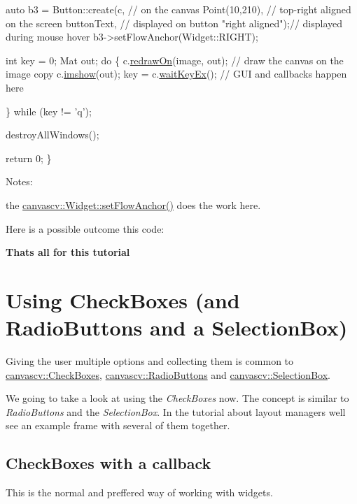 \begin{DoxyCode}
    \textcolor{keyword}{auto} b3 = Button::create(c,               \textcolor{comment}{// on the canvas}
                             Point(10,210),    \textcolor{comment}{// top-right aligned on the screen}
                             buttonText,      \textcolor{comment}{// displayed on button}
                             \textcolor{stringliteral}{"right aligned"});\textcolor{comment}{// displayed during mouse hover}
    b3->setFlowAnchor(Widget::RIGHT);

    \textcolor{keywordtype}{int} key = 0;
    Mat out;
    \textcolor{keywordflow}{do}
    \{
        c.\hyperlink{classcanvascv_1_1Canvas_a018c66e277de7904b8146ea3f3feebdd}{redrawOn}(image, out);  \textcolor{comment}{// draw the canvas on the image copy}
        c.\hyperlink{classcanvascv_1_1Canvas_acaf9494a5668046dd0a8908aa97a7a43}{imshow}(out);
        key = c.\hyperlink{classcanvascv_1_1Canvas_a59397db05f5d9e45264f626f6a2ae528}{waitKeyEx}(); \textcolor{comment}{// GUI and callbacks happen here}

    \} \textcolor{keywordflow}{while} (key != \textcolor{charliteral}{'q'});

    destroyAllWindows();

    \textcolor{keywordflow}{return} 0;
\}
\end{DoxyCode}
 Notes\+:
\begin{DoxyItemize}
\item the \hyperlink{classcanvascv_1_1Widget_a69f455f7fbf67f636ee1155795057b87}{canvascv\+::\+Widget\+::set\+Flow\+Anchor()} does the work here.
\item Here is a possible outcome this code\+:  ~\newline

\end{DoxyItemize}

{\bfseries That\textquotesingle{}s all for this tutorial} \hypertarget{tutcheckbox}{}\section{Using Check\+Boxes (and Radio\+Buttons and a Selection\+Box)}\label{tutcheckbox}
Giving the user multiple options and collecting them is common to \hyperlink{classcanvascv_1_1CheckBoxes}{canvascv\+::\+Check\+Boxes}, \hyperlink{classcanvascv_1_1RadioButtons}{canvascv\+::\+Radio\+Buttons} and \hyperlink{classcanvascv_1_1SelectionBox}{canvascv\+::\+Selection\+Box}.

We going to take a look at using the {\itshape Check\+Boxes} now. The concept is similar to {\itshape Radio\+Buttons} and the {\itshape Selection\+Box}. In the tutorial about layout managers we\textquotesingle{}ll see an example frame with several of them together.\hypertarget{tutcheckbox_checkbox_s1}{}\subsection{Check\+Boxes with a callback}\label{tutcheckbox_checkbox_s1}
This is the normal and preffered way of working with widgets.

